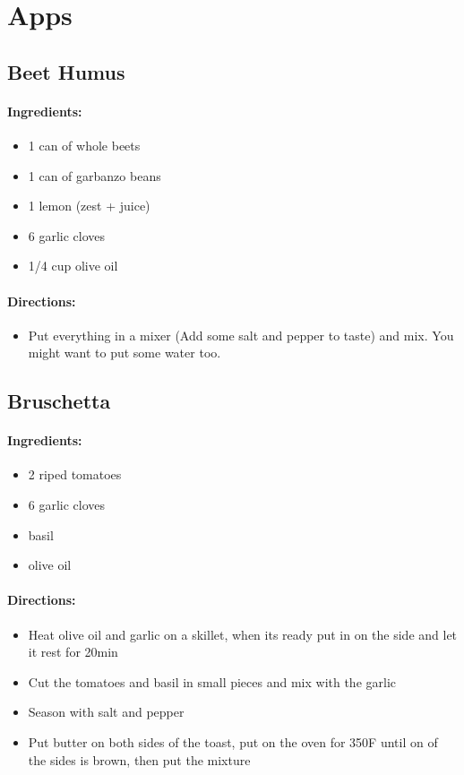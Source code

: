 \documentclass{article}
\begin{document}
\section{Apps}

\subsection{Beet Humus}

\paragraph{Ingredients:}

\begin{itemize}
	\item 1 can of whole beets
	\item 1 can of garbanzo beans
	\item 1 lemon (zest + juice)
	\item 6 garlic cloves
	\item 1/4 cup olive oil
\end{itemize}

\paragraph{Directions:}

\begin{itemize}
	\item Put everything in a mixer (Add some salt and pepper to taste) and mix. You might want to put some water too.
\end{itemize}

\subsection{Bruschetta}

\paragraph{Ingredients:}

\begin{itemize}
	\item 2 riped tomatoes
	\item 6 garlic cloves
	\item basil
	\item olive oil
\end{itemize}

\paragraph{Directions:}
\begin{itemize}
	\item Heat olive oil and garlic on a skillet, when its ready put in on the side and let it rest for 20min
	\item Cut the tomatoes and basil in small pieces and mix with the garlic
	\item Season with salt and pepper
	\item Put butter on both sides of the toast, put on the oven for 350F until on of the sides is brown, then put the mixture
\end{itemize}
\end{document}
